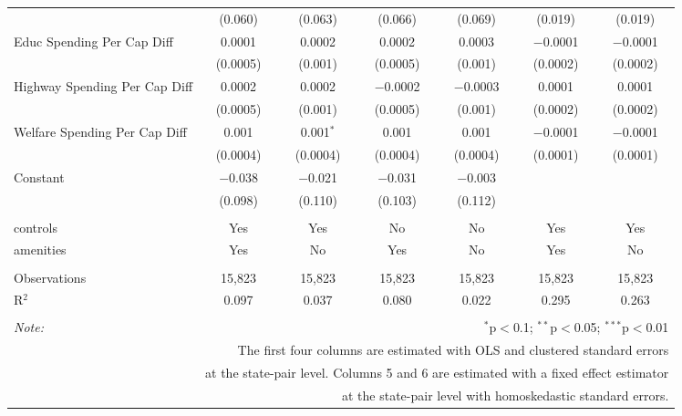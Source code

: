 \begin{table}[!htbp]
\begin{tabular}{@{\extracolsep{5pt}}lcccccc}
  & (0.060) & (0.063) & (0.066) & (0.069) & (0.019) & (0.019) \\ 
  Educ Spending Per Cap Diff & 0.0001 & 0.0002 & 0.0002 & 0.0003 & $-$0.0001 & $-$0.0001 \\ 
  & (0.0005) & (0.001) & (0.0005) & (0.001) & (0.0002) & (0.0002) \\ 
  Highway Spending Per Cap Diff & 0.0002 & 0.0002 & $-$0.0002 & $-$0.0003 & 0.0001 & 0.0001 \\ 
  & (0.0005) & (0.001) & (0.0005) & (0.001) & (0.0002) & (0.0002) \\ 
  Welfare Spending Per Cap Diff & 0.001 & 0.001$^{*}$ & 0.001 & 0.001 & $-$0.0001 & $-$0.0001 \\ 
  & (0.0004) & (0.0004) & (0.0004) & (0.0004) & (0.0001) & (0.0001) \\ 
  Constant & $-$0.038 & $-$0.021 & $-$0.031 & $-$0.003 &  &  \\ 
  & (0.098) & (0.110) & (0.103) & (0.112) &  &  \\ 
 \hline \\[-1.8ex] 
controls & Yes & Yes & No & No & Yes & Yes \\ 
amenities & Yes & No & Yes & No & Yes & No \\ 
\hline \\[-1.8ex] 
Observations & 15,823 & 15,823 & 15,823 & 15,823 & 15,823 & 15,823 \\ 
R$^{2}$ & 0.097 & 0.037 & 0.080 & 0.022 & 0.295 & 0.263 \\ 
\hline 
\hline \\[-1.8ex] 
\textit{Note:}  & \multicolumn{6}{r}{$^{*}$p$<$0.1; $^{**}$p$<$0.05; $^{***}$p$<$0.01} \\ 
 & \multicolumn{6}{r}{The first four columns are estimated with OLS and clustered standard errors} \\ 
 & \multicolumn{6}{r}{at the state-pair level. Columns 5 and 6 are estimated with a fixed effect estimator} \\ 
 & \multicolumn{6}{r}{at the state-pair level with homoskedastic standard errors.} \\ 
\end{tabular} 
\end{table} 
